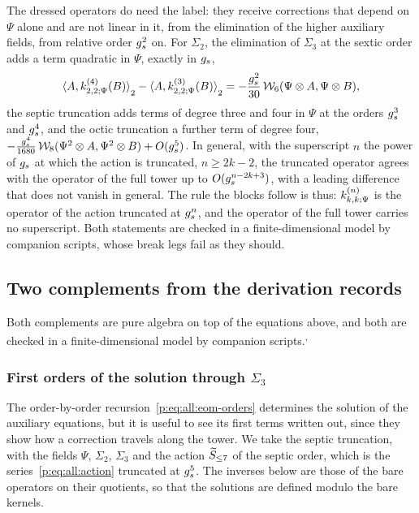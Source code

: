 \noindent{} The dressed operators do need the label: they receive corrections that depend on $\Psi$ alone and are not linear in it, from the elimination of the higher auxiliary fields, from relative order $\gs^2$ on.
For $\Sigma_2$, the elimination of $\Sigma_3$ at the sextic order adds a term quadratic in $\Psi$, exactly in $\gs$,
\begin{equation}
  \label{ch3:eq:label-k2}
  \pair[2]{A}{\kin{2}{\Psi}{4}(B)}
    - \pair[2]{A}{\kin{2}{\Psi}{3}(B)}
    = - \frac{\gs^2}{30} \, \dvertex{6}(\Psi \otimes A, \Psi \otimes B),
\end{equation}
the septic truncation adds terms of degree three and four in $\Psi$ at the orders $\gs^3$ and $\gs^4$, and the octic truncation a further term of degree four, $- \tfrac{\gs^4}{1680} \, \dvertex{8}(\Psi^2 \otimes A, \Psi^2 \otimes B) + O(\gs^5)$.
In general, with the superscript $n$ the power of $\gs$ at which the action is truncated, $n \ge 2 k - 2$, the truncated operator agrees with the operator of the full tower up to $O(\gs^{n - 2 k + 3})$, with a leading difference that does not vanish in general.
The rule the blocks follow is thus: $\kin{k}{\Psi}{n}$ is the operator of the action truncated at $\gs^n$, and the operator of the full tower carries no superscript.
Both statements are checked in a finite-dimensional model by companion scripts, whose break legs fail as they should.

\subsection{Two complements from the derivation records}
\label{ch3:sec:complements}

\noindent{} Both complements are pure algebra on top of the equations above, and both are checked in a finite-dimensional model by companion scripts.\textsuperscript{,}

\subsubsection{First orders of the solution through \texorpdfstring{$\Sigma_3$}{Sigma3}}
\label{ch3:sec:first-orders}

The order-by-order recursion~\eqref{p:eq:all:eom-orders} determines the solution of the auxiliary equations, but it is useful to see its first terms written out, since they show how a correction travels along the tower.
We take the septic truncation, with the fields $\Psi$, $\Sigma_2$, $\Sigma_3$ and the action $\caction[\le 7]$ of the septic order, which is the series~\eqref{p:eq:all:action} truncated at $\gs^5$.
The inverses below are those of the bare operators on their quotients, so that the solutions are defined modulo the bare kernels.

